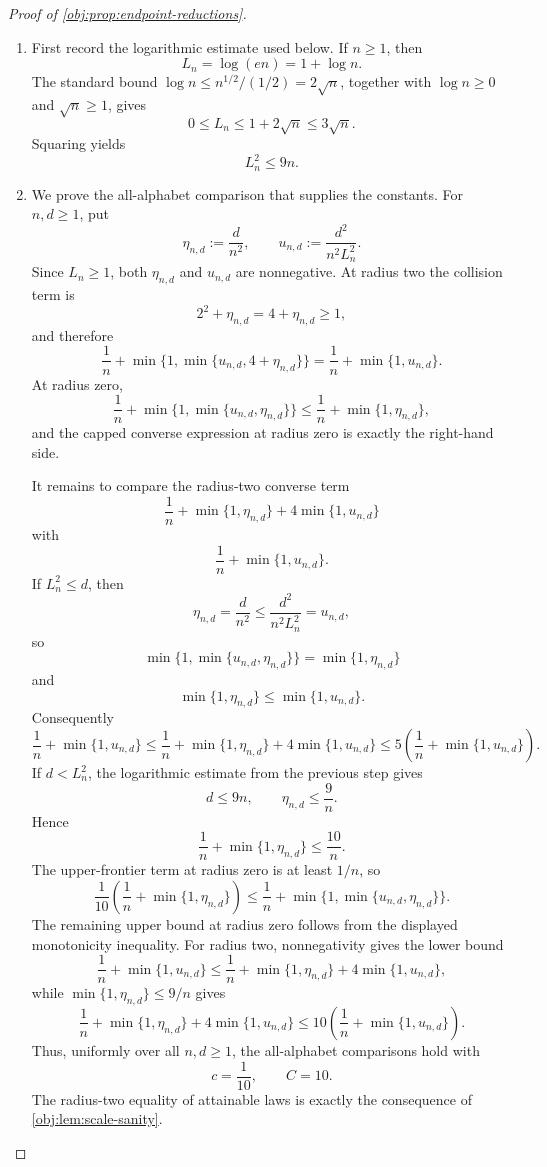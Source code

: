\documentclass[11pt]{article}
\begin{document}
\begin{proof}[Proof of \cref{obj:prop:endpoint-reductions}]
\begin{enumerate}
\item First record the logarithmic estimate used below.  If \(n\ge1\), then
\[
L_n=\log(en)=1+\log n .
\]
The standard bound \(\log n\le n^{1/2}/(1/2)=2\sqrt n\), together with
\(\log n\ge0\) and \(\sqrt n\ge1\), gives
\[
0\le L_n\le 1+2\sqrt n\le 3\sqrt n .
\]
Squaring yields
\[
L_n^2\le 9n .
\]

\item We prove the all-alphabet comparison that supplies the constants.  For \(n,d\ge1\), put
\[
\eta_{n,d}:=\frac{d}{n^2},
\qquad
u_{n,d}:=\frac{d^2}{n^2L_n^2}.
\]
Since \(L_n\ge1\), both \(\eta_{n,d}\) and \(u_{n,d}\) are nonnegative.  At radius two the collision term is
\[
2^2+\eta_{n,d}=4+\eta_{n,d}\ge1,
\]
and therefore
\[
\frac1n+\min\{1,\min\{u_{n,d},4+\eta_{n,d}\}\}
=
\frac1n+\min\{1,u_{n,d}\}.
\]
At radius zero,
\[
\frac1n+\min\{1,\min\{u_{n,d},\eta_{n,d}\}\}
\le
\frac1n+\min\{1,\eta_{n,d}\},
\]
and the capped converse expression at radius zero is exactly the right-hand side.

It remains to compare the radius-two converse term
\[
\frac1n+\min\{1,\eta_{n,d}\}+4\min\{1,u_{n,d}\}
\]
with
\[
\frac1n+\min\{1,u_{n,d}\}.
\]
If \(L_n^2\le d\), then
\[
\eta_{n,d}=\frac d{n^2}\le \frac{d^2}{n^2L_n^2}=u_{n,d},
\]
so
\[
\min\{1,\min\{u_{n,d},\eta_{n,d}\}\}=\min\{1,\eta_{n,d}\}
\]
and
\[
\min\{1,\eta_{n,d}\}\le \min\{1,u_{n,d}\}.
\]
Consequently
\[
\frac1n+\min\{1,u_{n,d}\}
\le
\frac1n+\min\{1,\eta_{n,d}\}+4\min\{1,u_{n,d}\}
\le
5\left(\frac1n+\min\{1,u_{n,d}\}\right).
\]
If \(d<L_n^2\), the logarithmic estimate from the previous step gives
\[
d\le 9n,
\qquad
\eta_{n,d}\le \frac9n .
\]
Hence
\[
\frac1n+\min\{1,\eta_{n,d}\}\le \frac{10}{n}.
\]
The upper-frontier term at radius zero is at least \(1/n\), so
\[
\frac1{10}\left(\frac1n+\min\{1,\eta_{n,d}\}\right)
\le
\frac1n+\min\{1,\min\{u_{n,d},\eta_{n,d}\}\}.
\]
The remaining upper bound at radius zero follows from the displayed monotonicity inequality.  For radius two, nonnegativity gives the lower bound
\[
\frac1n+\min\{1,u_{n,d}\}
\le
\frac1n+\min\{1,\eta_{n,d}\}+4\min\{1,u_{n,d}\},
\]
while \(\min\{1,\eta_{n,d}\}\le 9/n\) gives
\[
\frac1n+\min\{1,\eta_{n,d}\}+4\min\{1,u_{n,d}\}
\le
10\left(\frac1n+\min\{1,u_{n,d}\}\right).
\]
Thus, uniformly over all \(n,d\ge1\), the all-alphabet comparisons hold with
\[
c=\frac1{10},
\qquad
C=10 .
\]
The radius-two equality of attainable laws is exactly the consequence of \cref{obj:lem:scale-sanity}.


\end{enumerate}
\end{proof}
\end{document}
